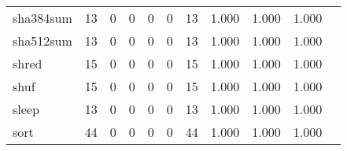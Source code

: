 \begin{longtable}{lp{1.2cm}p{1.2cm}p{1.2cm}p{1.2cm}p{1.2cm}p{1.2cm}p{1.2cm}p{1.2cm}p{1.2cm}p{1.2cm}}
sha384sum &                                    13 &                                                  0 &                                                  0 &                                                  0 &                                                  0 &                                                 13 &                                              1.000 &                                              1.000 &                                              1.000 \\
sha512sum &                                    13 &                                                  0 &                                                  0 &                                                  0 &                                                  0 &                                                 13 &                                              1.000 &                                              1.000 &                                              1.000 \\
shred     &                                    15 &                                                  0 &                                                  0 &                                                  0 &                                                  0 &                                                 15 &                                              1.000 &                                              1.000 &                                              1.000 \\
shuf      &                                    15 &                                                  0 &                                                  0 &                                                  0 &                                                  0 &                                                 15 &                                              1.000 &                                              1.000 &                                              1.000 \\
sleep     &                                    13 &                                                  0 &                                                  0 &                                                  0 &                                                  0 &                                                 13 &                                              1.000 &                                              1.000 &                                              1.000 \\
sort      &                                    44 &                                                  0 &                                                  0 &                                                  0 &                                                  0 &                                                 44 &                                              1.000 &                                              1.000 &                                              1.000 \\

\end{longtable}
